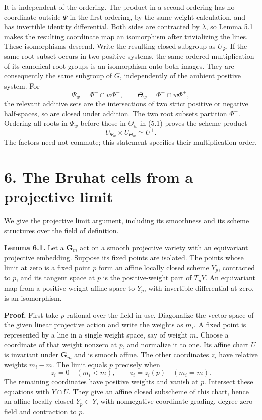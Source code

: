 \documentclass[11pt,a4paper,openany]{report}
\begin{document}
It is independent of the ordering. The product in a second ordering has no coordinate outside \(\Psi\) in the first ordering, by the same weight calculation, and has invertible identity differential. Both sides are contracted by \(\lambda\), so Lemma 5.1 makes the resulting coordinate map an isomorphism after trivializing the lines. These isomorphisms descend. Write the resulting closed subgroup as \(U_\Psi\). If the same root subset occurs in two positive systems, the same ordered multiplication of its canonical root groups is an isomorphism onto both images. They are consequently the same subgroup of \(G\), independently of the ambient positive system. For \[
       \Psi_w=\Phi^+\cap w\Phi^-,
       \qquad \Theta_w=\Phi^+\cap w\Phi^+,
\tag{5.4}
\] the relevant additive sets are the intersections of two strict positive or negative half-spaces, so are closed under addition. The two root subsets partition \(\Phi^+\). Ordering all roots in \(\Psi_w\) before those in \(\Theta_w\) in (5.1) proves the scheme product \[
                    U_{\Psi_w}\times U_{\Theta_w}\simeq U^+.
\] The factors need not commute; this statement specifies their multiplication order.

\section{6. The Bruhat cells from a projective limit}\label{AG-RG-04-the-bruhat-cells-from-a-projective-limit}

We give the projective limit argument, including its smoothness and its scheme structures over the field of definition.

\textbf{Lemma 6.1.} Let a \(\mathbf G_m\) act on a smooth projective variety with an equivariant projective embedding. Suppose its fixed points are isolated. The points whose limit at zero is a fixed point \(p\) form an affine locally closed scheme \(Y_p\), contracted to \(p\), and its tangent space at \(p\) is the positive-weight part of \(T_pY\). An equivariant map from a positive-weight affine space to \(Y_p\), with invertible differential at zero, is an isomorphism.

\textbf{Proof.} First take \(p\) rational over the field in use. Diagonalize the vector space of the given linear projective action and write the weights as \(m_i\). A fixed point is represented by a line in a single weight space, say of weight \(m\). Choose a coordinate of that weight nonzero at \(p\), and normalize it to one. Its affine chart \(U\) is invariant under \(\mathbf G_m\) and is smooth affine. The other coordinates \(z_i\) have relative weights \(m_i-m\). The limit equals \(p\) precisely when \[
 z_i=0\quad(m_i<m),\qquad
 z_i=z_i(p)\quad(m_i=m).
\] The remaining coordinates have positive weights and vanish at \(p\). Intersect these equations with \(Y\cap U\). They give an affine closed subscheme of this chart, hence an affine locally closed \(Y_p\subset Y\), with nonnegative coordinate grading, degree-zero field and contraction to \(p\).
\end{document}
